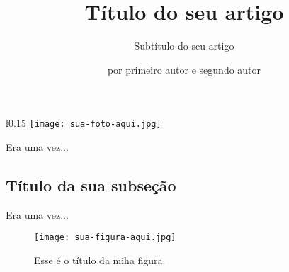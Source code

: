 %
% 
%
%

\title{Título do seu artigo}
\subtitle{Subtítulo do seu artigo}
\author{por primeiro autor e segundo autor}
\maketitle



\begin{wrapfigure}{l}{0.15\textwidth}
\texttt{[image: sua-foto-aqui.jpg]}
\end{wrapfigure}



Era uma vez...



\subsection{Título da sua subseção}
\label{subsec:rótulo-da-sua-subseção}



Era uma vez...



\begin{figure}[htbp]
   \centering
   \texttt{[image: sua-figura-aqui.jpg]}

   \caption{Esse é o título da miha figura.}

   \label{fig:rótulo-da-figura}
\end{figure}



